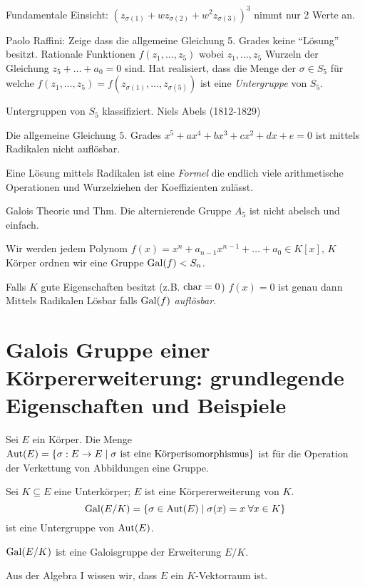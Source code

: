 Fundamentale Einsicht: $\left( z_{\sigma(1)} + w z_{\sigma(2)} + w^2 z_{\sigma(3)} \right)^3$ nimmt nur $2$ Werte an.

Paolo Raffini: Zeige dass die allgemeine Gleichung 5. Grades keine \enquote{Lösung} besitzt.
Rationale Funktionen $f(z_1,\ldots,z_{5})$ wobei $z_1,\ldots, z_5$ Wurzeln der Gleichung $z_5 + \ldots + a_0 = 0$ sind.
Hat realisiert, dass die Menge der $\sigma \in S_{5}$ für welche $f(z_1,\ldots,z_5) = f(z_{\sigma(1)},\ldots,z_{\sigma(5)})$ 
ist eine \emph{Untergruppe} von $S_{5}$.

Untergruppen von $S_{5}$ klassifiziert. Niels Abels (1812-1829)

\begin{theorem}
	Die allgemeine Gleichung $5.$ Grades $x^{5} + a x^{4}  + b x^3 + c x^2 + d x + e = 0$ ist mittels Radikalen nicht auflösbar.
\end{theorem}
Eine Lösung mittels Radikalen ist eine \emph{Formel} die endlich viele arithmetische Operationen und Wurzelziehen der Koeffizienten zulässt.

Galois Theorie und Thm. Die alternierende Gruppe $A_{5}$ ist nicht abelsch und einfach.

Wir werden jedem Polynom $f(x) = x^{n} + a_{n-1} x^{n-1} + \ldots + a_0 \in K[x]$, $K$ Körper
ordnen wir eine Gruppe $\operatorname{Gal}(f) < S_{n}$.

\begin{theorem}
	Falls $K$ gute Eigenschaften besitzt (z.B. $\operatorname{char} = 0$)
	$f(x) = 0$ ist genau dann Mittels Radikalen Lösbar falls $\operatorname{Gal}(f)$ \emph{auflösbar}.
\end{theorem}

\section{Galois Gruppe einer Körpererweiterung: grundlegende Eigenschaften und Beispiele}
Sei $E$ ein Körper. Die Menge $\operatorname{Aut}(E) = \{\sigma: E \to E \mid \sigma \text{ ist eine Körperisomorphismus}\} $ 
ist für die Operation der Verkettung von Abbildungen eine Gruppe.

Sei $K \subseteq E$ eine Unterkörper; $E$ ist eine Körpererweiterung von $K$.
\[
	\gal(E / K) = \{\sigma \in \aut(E) \mid \sigma(x) = x \forall x \in K\} 
\]
ist eine Untergruppe von $\operatorname{Aut}(E)$.
\begin{definition}
	$\operatorname{Gal}(E / K)$ ist eine Galoisgruppe der Erweiterung $E / K$.
\end{definition}
Aus der Algebra I wissen wir, dass $E$ ein $K$-Vektorraum ist.

